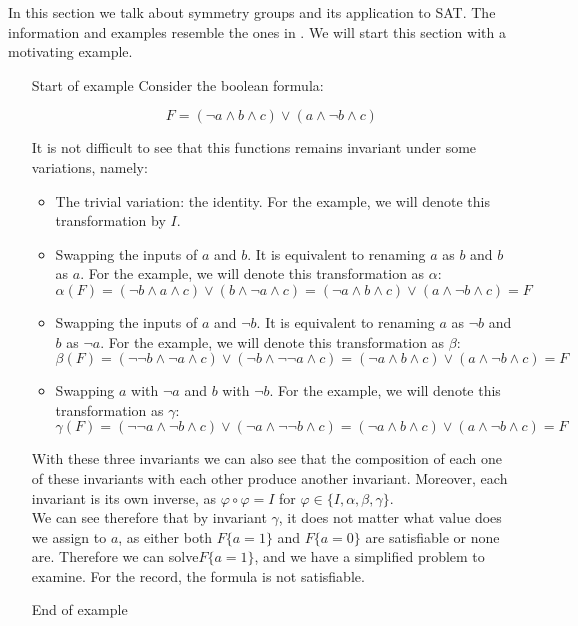 In this section we talk about symmetry groups and its application to SAT. The information and examples resemble the ones in \cite{sakallah2009symmetry}. We will start this section with a motivating example.
\begin{itemize}
 \item[Start of example]
Consider the boolean formula:

$$ F = (\neg a \land b  \land c) \lor (a \land \neg b \land c)$$

It is not difficult to see that this functions remains invariant under some variations, namely:

\begin{itemize}
\item The trivial variation: the identity. For the example, we will denote this transformation by  $I$.

\item Swapping the inputs of $a$ and $b$. It is equivalent to renaming $a$ as $b$ and $b$ as $a$. For the example, we will denote this transformation as $\alpha$: 
  $$\alpha(F) = (\neg b \land a  \land c) \lor (b \land \neg a \land c) = (\neg a \land b  \land c) \lor (a \land \neg b \land c) = F$$
\item Swapping the inputs of $a$ and $\neg b$. It is equivalent to renaming $a$ as $\neg b$ and $b$ as $\neg a$. For the example, we will denote this transformation as $\beta$: 
  $$\beta(F) = (\neg \neg b \land \neg a  \land c) \lor (\neg b \land \neg \neg a \land c) = (\neg a \land b  \land c) \lor (a \land \neg b \land c) = F$$

\item Swapping $a$ with $\neg a$ and $b$ with $\neg b$. For the example, we will denote this transformation as $\gamma$: 
  $$\gamma(F) = (\neg \neg a \land \neg b  \land c) \lor (\neg a \land \neg \neg b \land c) = (\neg a \land b  \land c) \lor (a \land \neg b \land c) = F$$
\end{itemize}

With these three invariants we can also see that the composition of each one of these invariants with each other produce another invariant. Moreover, each invariant is its own inverse, as $\varphi \circ \varphi = I $ for $\varphi \in \{I, \alpha, \beta, \gamma\}$.\\

We can see therefore that by invariant $\gamma$, it does not matter what value does we assign to $a$, as either both $F\{a = 1\}$ and $F\{a=0\}$ are satisfiable or none are. Therefore we can solve$F\{a=1\}$, and we have a simplified problem to examine. For the record, the formula is not satisfiable.
\item[End of example]


\end{itemize}
